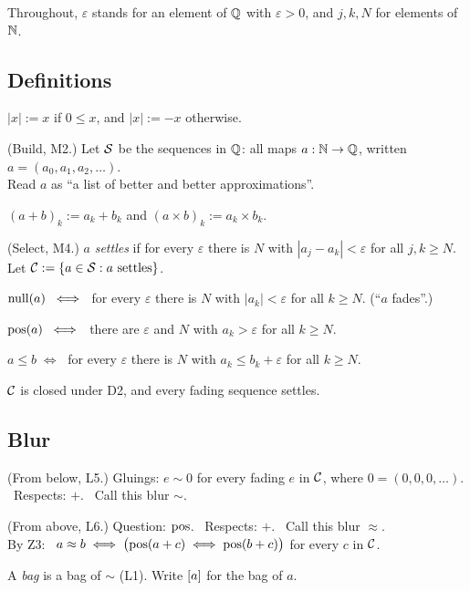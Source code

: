 Throughout, $\varepsilon$ stands for an element of $\mathbb{Q}$ with $\varepsilon > 0$, and $j, k, N$ for elements of $\mathbb{N}$.

\subsection*{Definitions}

\begin{lines}
\item[\lab{D0}] $|x| := x$ if $0 \le x$, and $|x| := -x$ otherwise.
\item[\lab{D1}] (Build, M2.) Let $\mathcal{S}$ be the sequences in $\mathbb{Q}$: all maps $a : \mathbb{N} \to \mathbb{Q}$, written $a = (a_0, a_1, a_2, \dots)$. \\ Read $a$ as ``a list of better and better approximations''.
\item[\lab{D2}] $(a + b)_k := a_k + b_k$ \quad and \quad $(a \times b)_k := a_k \times b_k$.
\item[\lab{D3}] (Select, M4.) $a$ \emph{settles} if for every $\varepsilon$ there is $N$ with $|a_j - a_k| < \varepsilon$ for all $j, k \ge N$. \\
Let $\mathcal{C} := \{a \in \mathcal{S} : a \text{ settles}\}$.
\item[\lab{D4}] $\operatorname{null}(a) \;\iff\;$ for every $\varepsilon$ there is $N$ with $|a_k| < \varepsilon$ for all $k \ge N$. \quad (``$a$ fades''.)
\item[\lab{D5}] $\operatorname{pos}(a) \;\iff\;$ there are $\varepsilon$ and $N$ with $a_k > \varepsilon$ for all $k \ge N$.
\item[\lab{D6}] $a \le b \;\iff\;$ for every $\varepsilon$ there is $N$ with $a_k \le b_k + \varepsilon$ for all $k \ge N$.
\end{lines}
$\mathcal{C}$ is closed under D2, and every fading sequence settles.

\subsection*{Blur}

\begin{lines}
\item[\lab{B1}] (From below, L5.) Gluings: $e \sim 0$ for every fading $e$ in $\mathcal{C}$, where $0 = (0, 0, 0, \dots)$. \ Respects: $+$. \ Call this blur $\sim$.
\item[\lab{B2}] (From above, L6.) Question: $\operatorname{pos}$. \ Respects: $+$. \ Call this blur $\approx$. \\
By Z3: \ $a \approx b \iff \bigl(\operatorname{pos}(a+c) \iff \operatorname{pos}(b+c)\bigr)$ for every $c$ in $\mathcal{C}$.
\item[] A \emph{bag} is a bag of $\sim$ (L1). Write $[a]$ for the bag of $a$.
\end{lines}

